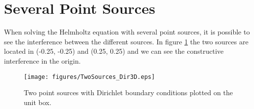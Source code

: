 \documentclass[10pt,a4paper]{article}
\begin{document}
\section*{Several Point Sources}
When solving the Helmholtz equation with several point sources, it is possible to see the interference between the different sources. In figure \ref{fig:severalSources} the two sources are located in (-0.25, -0.25) and (0.25, 0.25) and we can see the constructive interference in the origin.

\begin{figure}[h!]
\centering
    \texttt{[image: figures/TwoSources\_Dir3D.eps]}
	\caption{Two point sources with Dirichlet boundary conditions plotted on the unit box.}
  \label{fig:severalSources}
\end{figure}
\end{document}
